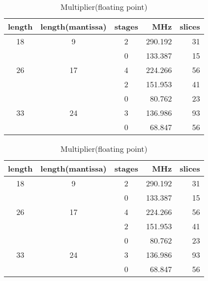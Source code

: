 \documentclass{llncs}
\begin{document}
\begin{table}
  \begin{center}
    \begin{minipage}{.45\linewidth}
      \caption{Multiplier(floating point)}
      \begin{center}
	\begin{tabular}{cccrr}
	  \hline
	  \hline
	  length  & length(mantissa) & stages & MHz & slices\\
	  \hline
	  18   &  9 & 2 & 290.192 &  31 \\
	  &    & 0 & 133.387 &  15 \\
	  \hline
	  26   & 17 & 4 & 224.266 &  56 \\
	  &    & 2 & 151.953 &  41 \\
	  &    & 0 &  80.762 &  23 \\
	  \hline
	  33   & 24 & 3 & 136.986 &  93 \\
	  &    & 0 &  68.847 &  56\\
	  \hline
	  \hline
	\end{tabular}
      \end{center}
      \label{tabpg_float_mult}
    \end{minipage}
    \hspace{2.4pc}
    \begin{minipage}{.45\linewidth}
      \caption{Multiplier(floating point)}
      \begin{center}
	\begin{tabular}{cccrr}
	  \hline
	  \hline
	  length  & length(mantissa) & stages & MHz & slices\\
	  \hline
	  18   &  9 & 2 & 290.192 &  31 \\
	  &    & 0 & 133.387 &  15 \\
	  \hline
	  26   & 17 & 4 & 224.266 &  56 \\
	  &    & 2 & 151.953 &  41 \\
	  &    & 0 &  80.762 &  23 \\
	  \hline
	  33   & 24 & 3 & 136.986 &  93 \\
	  &    & 0 &  68.847 &  56\\
	  \hline
	  \hline
	\end{tabular}
      \end{center}
      \label{tabpg_float_mult}
    \end{minipage}
  \end{center}


\end{table}
\end{document}
